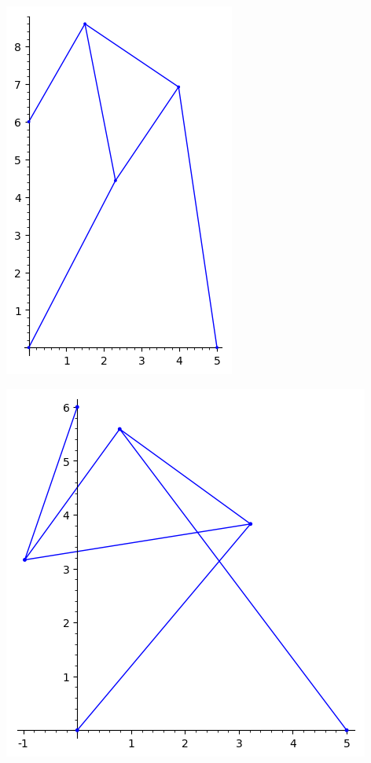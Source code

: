 \documentclass{article}
\begin{document}
\begin{multicols}{2}
\begin{center}
\includegraphics[scale=0.4]{lidur5b5plot}
\end{center}
\columnbreak
\begin{center}
\includegraphics[scale=0.4]{lidur5b6plot}
\end{center}
\end{multicols}
\end{document}
